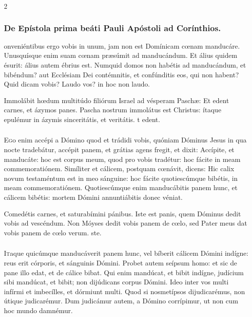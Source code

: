 \documentclass[9pt,twoside]{extarticle}
\begin{document}
\begin{multicols}{2}
\subsubsection*{\center De Epístola prima beáti Pauli Apóstoli ad Corínthios.}
onveniéntibus ergo vobis in unum, jam non est Domínicam cœnam manducáre. Unusquísque enim suam cœnam præsúmit ad manducándum. Et álius quidem ésurit: álius autem ébrius est. Numquid domos non habétis ad manducándum, et bibéndum? aut Ecclésiam Dei contémnitis, et confúnditis eos, qui non habent? Quid dicam vobis? Laudo vos? in hoc non laudo.

\begin{tightlist}{}
\item {} Immolábit hœdum multitúdo filiórum Israel ad vésperam Paschæ: \textred{*} Et edent carnes, et ázymos panes.  Pascha nostrum immolátus est Christus: ítaque epulémur in ázymis sinceritátis, et veritátis. t edent.
\end{tightlist}

\subsubsection*{\center{}}
\lettrine{E}go enim accépi a Dómino quod et trádidi vobis, quóniam Dóminus Jesus in qua nocte tradebátur, accépit panem, et grátias agens fregit, et dixit: Accípite, et manducáte: hoc est corpus meum, quod pro vobis tradétur: hoc fácite in meam commemoratiónem. Simíliter et cálicem, postquam cœnávit, dicens: Hic calix novum testaméntum est in meo sánguine: hoc fácite quotiescúmque bibétis, in meam commemoratiónem. Quotiescúmque enim manducábitis panem hunc, et cálicem bibétis: mortem Dómini annuntiábitis donec véniat.

\begin{tightlist}{}
\item {} Comedétis carnes, et saturabímini pánibus. \textred{*} Iste est panis, quem Dóminus dedit vobis ad vescéndum.  Non Móyses dedit vobis panem de cœlo, sed Pater meus dat vobis panem de cœlo verum. ste.
\end{tightlist}

\subsubsection*{\center{}}
\lettrine{I}taque quicúmque manducáverit panem hunc, vel bíberit cálicem Dómini indígne: reus erit córporis, et sánguinis Dómini. Probet autem seípsum homo: et sic de pane illo edat, et de cálice bibat. Qui enim mandúcat, et bibit indígne, judícium sibi mandúcat, et bibit; non dijúdicans corpus Dómini. Ideo inter vos multi infírmi et imbecílles, et dórmiunt multi. Quod si nosmetípsos dijudicarémus, non útique judicarémur. Dum judicámur autem, a Dómino corrípimur, ut non cum hoc mundo damnémur.


\end{multicols}
\end{document}

